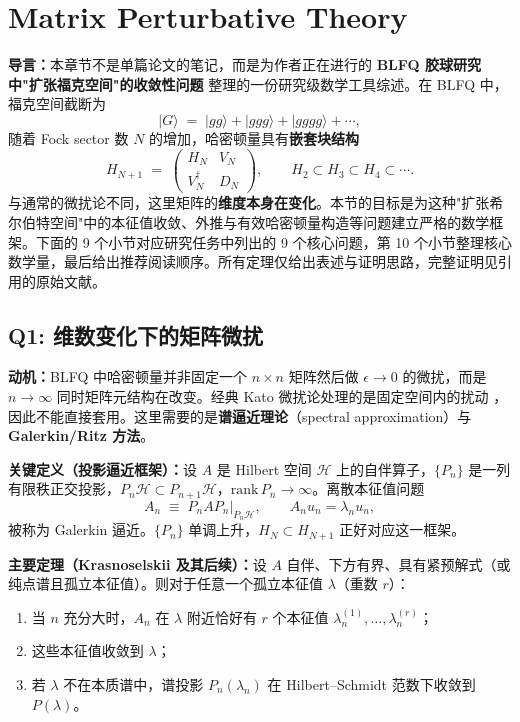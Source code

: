 \documentclass{article}
\begin{document}
\section{Matrix Perturbative Theory}

\textbf{导言：}本章节不是单篇论文的笔记，而是为作者正在进行的 \textbf{BLFQ 胶球研究中"扩张福克空间"的收敛性问题} 整理的一份研究级数学工具综述。在 BLFQ 中，福克空间截断为
\[
|G\rangle \;=\; |gg\rangle + |ggg\rangle + |gggg\rangle+\cdots,
\]
随着 Fock sector 数 $N$ 的增加，哈密顿量具有\textbf{嵌套块结构}
\[
H_{N+1} \;=\; \begin{pmatrix} H_{N} & V_{N} \\ V_{N}^{\dagger} & D_{N} \end{pmatrix},\qquad H_{2}\subset H_{3}\subset H_{4}\subset\cdots.
\]
与通常的微扰论不同，这里矩阵的\textbf{维度本身在变化}。本节的目标是为这种"扩张希尔伯特空间"中的本征值收敛、外推与有效哈密顿量构造等问题建立严格的数学框架。下面的 9 个小节对应研究任务中列出的 9 个核心问题，第 10 个小节整理核心数学量，最后给出推荐阅读顺序。所有定理仅给出表述与证明思路，完整证明见引用的原始文献。

\subsection{Q1: 维数变化下的矩阵微扰}

\textbf{动机：}BLFQ 中哈密顿量并非固定一个 $n\times n$ 矩阵然后做 $\epsilon\to 0$ 的微扰，而是 $n\to\infty$ 同时矩阵元结构在改变。经典 Kato 微扰论处理的是固定空间内的扰动 \cite{Kato_1976}，因此不能直接套用。这里需要的是\textbf{谱逼近理论}（spectral approximation）与\textbf{Galerkin/Ritz 方法}。

\textbf{关键定义（投影逼近框架）：}设 $A$ 是 Hilbert 空间 $\mathcal{H}$ 上的自伴算子，$\{P_{n}\}$ 是一列有限秩正交投影，$P_{n}\mathcal{H}\subset P_{n+1}\mathcal{H}$，$\mathrm{rank}\,P_{n}\to\infty$。离散本征值问题
\[
A_{n} \;\equiv\; P_{n} A P_{n}\big|_{P_{n}\mathcal{H}},\qquad A_{n}u_{n}=\lambda_{n}u_{n},
\]
被称为 Galerkin 逼近。$\{P_{n}\}$ 单调上升，$H_{N}\subset H_{N+1}$ 正好对应这一框架。

\textbf{主要定理（Krasnoselskii 及其后续）：}设 $A$ 自伴、下方有界、具有紧预解式（或纯点谱且孤立本征值）。则对于任意一个孤立本征值 $\lambda$（重数 $r$）：
\begin{enumerate}
    \item 当 $n$ 充分大时，$A_{n}$ 在 $\lambda$ 附近恰好有 $r$ 个本征值 $\lambda_{n}^{(1)},\dots,\lambda_{n}^{(r)}$；
    \item 这些本征值收敛到 $\lambda$；
    \item 若 $\lambda$ 不在本质谱中，谱投影 $P_{n}(\lambda_{n})$ 在 Hilbert--Schmidt 范数下收敛到 $P(\lambda)$。
\end{enumerate}
\end{document}
